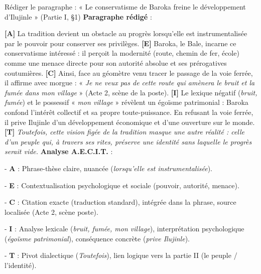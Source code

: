 \documentclass[11pt]{article}
\begin{document}
\begin{exoresolu}{Rédiger le paragraphe : « Le conservatisme de Baroka freine le développement d'Ilujinle » (Partie I, §1)}
\textbf{Paragraphe rédigé} :\par
\textbf{[A]} La tradition devient un obstacle au progrès lorsqu'elle est instrumentalisée par le pouvoir pour conserver ses privilèges. \textbf{[E]} Baroka, le Bale, incarne ce conservatisme intéressé : il perçoit la modernité (route, chemin de fer, école) comme une menace directe pour son autorité absolue et ses prérogatives coutumières. \textbf{[C]} Ainsi, face au géomètre venu tracer le passage de la voie ferrée, il affirme avec morgue : « \emph{Je ne veux pas de cette route qui amènera le bruit et la fumée dans mon village} » (Acte 2, scène de la poste). \textbf{[I]} Le lexique négatif (\emph{bruit, fumée}) et le possessif « \emph{mon village} » révèlent un égoïsme patrimonial : Baroka confond l'intérêt collectif et sa propre toute-puissance. En refusant la voie ferrée, il prive Ilujinle d'un développement économique et d'une ouverture sur le monde. \textbf{[T]} \emph{Toutefois, cette vision figée de la tradition masque une autre réalité : celle d'un peuple qui, à travers ses rites, préserve une identité sans laquelle le progrès serait vide.}
\tcblower
\textbf{Analyse A.E.C.I.T.} :\par
- \textbf{A} : Phrase-thèse claire, nuancée (\emph{lorsqu'elle est instrumentalisée}).\par
- \textbf{E} : Contextualisation psychologique et sociale (pouvoir, autorité, menace).\par
- \textbf{C} : Citation exacte (traduction standard), intégrée dans la phrase, source localisée (Acte 2, scène poste).\par
- \textbf{I} : Analyse lexicale (\emph{bruit, fumée, mon village}), interprétation psychologique (\emph{égoïsme patrimonial}), conséquence concrète (\emph{prive Ilujinle}).\par
- \textbf{T} : Pivot dialectique (\emph{Toutefois}), lien logique vers la partie II (le peuple / l'identité).
\end{exoresolu}
\end{document}
